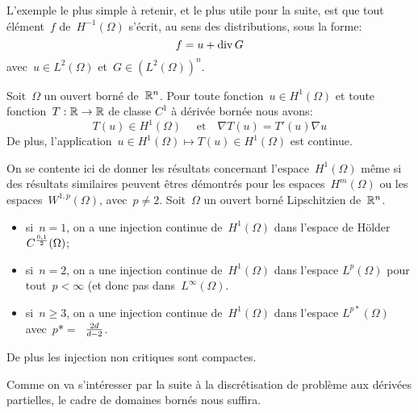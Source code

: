 \bigskip
L'exemple le plus simple à retenir, et le plus utile pour la suite, est que tout élément~$f$
de~$H^{-1}(\Omega)$ s'écrit, au sens des distributions, sous la forme:
\begin{equation}\colorred
f = u + \dive G
\end{equation}
avec~$u \in L^2(\Omega)$ et~$G \in (L^2(\Omega))^n$.
\medskip
\begin{theoreme}
Soit~$\Omega$ un ouvert borné de~$\mathbb R^n$.
Pour toute fonction~$u \in H^1(\Omega)$ et toute fonction~$T: \mathbb R \to \mathbb R$ de classe
$C^1$ à dérivée bornée nous avons:
\begin{equation}
T(u) \in H^1(\Omega)\quad\text{ et}\quad\nabla T(u) = T'(u)\nabla u
\end{equation}
De plus, l'application~$u \in H^1(\Omega) \mapsto T(u) \in H^1(\Omega)$ est continue.
\end{theoreme}
\medskip
On se contente ici de donner les résultats concernant l'espace~$H^1(\Omega)$ même
si des résultats similaires peuvent êtres démontrés pour les espaces~$H^m(\Omega)$
ou les espaces~$W^{1,p}(\Omega)$, avec~$p\ne 2$.
Soit~$\Omega$ un ouvert borné Lipschitzien de~$\mathbb R^n$.
\begin{itemize}
  \item si~$n=1$, on a une injection continue de~$H^1(\Omega)$ dans l'espace de
	H\"older~$C^{0,1\over2}(\Omega)$;
  \item si~$n=2$, on a une injection continue de~$H^1(\Omega)$ dans l'espace
	$L^p(\Omega)$ pour tout~$p<\infty$ (et donc pas dans~$L^\infty(\Omega)$.
  \item si~$n\ge 3$, on a une injection continue de~$H^1(\Omega)$ dans l'espace
	$L^{p*}(\Omega)$ avec~$p*=$~${2d}\over{d-2}$.
\end{itemize}
De plus les injection non critiques sont compactes.

Comme on va s'intéresser par la suite à la discrétisation de problème aux dérivées
partielles, le cadre de domaines bornés nous suffira.

\medskip
